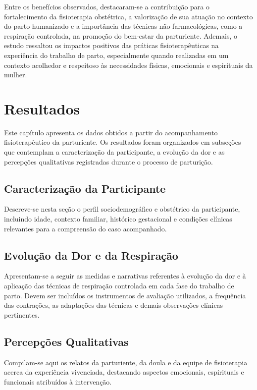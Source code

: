\documentclass[openright]{tex/estilos/normas-utf-tex}
\begin{document}
Entre os benefícios observados, destacaram-se a contribuição para o fortalecimento da fisioterapia obstétrica, a valorização de sua atuação no contexto do parto humanizado e a importância das técnicas não farmacológicas, como a respiração controlada, na promoção do bem-estar da parturiente. Ademais, o estudo ressaltou os impactos positivos das práticas fisioterapêuticas na experiência do trabalho de parto, especialmente quando realizadas em um contexto acolhedor e respeitoso às necessidades físicas, emocionais e espirituais da mulher.

\chapter{Resultados}
\label{chap:resultados}

Este capítulo apresenta os dados obtidos a partir do acompanhamento fisioterapêutico da parturiente. Os resultados foram organizados em subseções que contemplam a caracterização da participante, a evolução da dor e as percepções qualitativas registradas durante o processo de parturição.

\section{Caracterização da Participante}
\label{sec:caracterizacao}

Descreve-se nesta seção o perfil sociodemográfico e obstétrico da participante, incluindo idade, contexto familiar, histórico gestacional e condições clínicas relevantes para a compreensão do caso acompanhado.

\section{Evolução da Dor e da Respiração}
\label{sec:evolucao}

Apresentam-se a seguir as medidas e narrativas referentes à evolução da dor e à aplicação das técnicas de respiração controlada em cada fase do trabalho de parto. Devem ser incluídos os instrumentos de avaliação utilizados, a frequência das contrações, as adaptações das técnicas e demais observações clínicas pertinentes.

\section{Percepções Qualitativas}
\label{sec:percepcoes}

Compilam-se aqui os relatos da parturiente, da doula e da equipe de fisioterapia acerca da experiência vivenciada, destacando aspectos emocionais, espirituais e funcionais atribuídos à intervenção.
\end{document}
